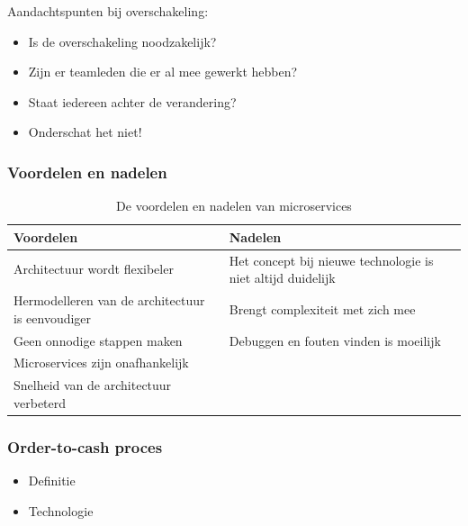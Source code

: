 \documentclass[aspectratio=169]{beamer}
\begin{document}
\begin{frame}
	Aandachtspunten bij overschakeling:
	\begin{itemize}
		\item Is de overschakeling noodzakelijk?
		\item Zijn er teamleden die er al mee gewerkt hebben?
		\item Staat iedereen achter de verandering?
		\item Onderschat het niet!
	\end{itemize}
\end{frame}

\begin{frame}
	\frametitle{Voordelen en nadelen}
	\begin{table}
		\begin{tabular}{p{6cm} p{6cm}}
			\textbf{Voordelen} & \textbf{Nadelen} \\
			\midrule
			Architectuur wordt flexibeler & Het concept bij nieuwe technologie is niet altijd duidelijk              \\
			\midrule
			Hermodelleren van de architectuur is eenvoudiger    & Brengt complexiteit met zich mee   \\
			\midrule
			Geen onnodige stappen maken & Debuggen en fouten vinden is moeilijk              \\
			\midrule
			Microservices zijn onafhankelijk    &    \\
			\midrule
			Snelheid van de architectuur verbeterd &               \\
			\bottomrule
		\end{tabular}
		
		\label{tab:voorbeeld}
		\caption{De voordelen en nadelen van microservices}
	\end{table}

\end{frame}

\begin{frame}
	\frametitle{Order-to-cash proces}
	\begin{itemize}
		\item Definitie
		\item Technologie
	\end{itemize}

\end{frame}
\end{document}
